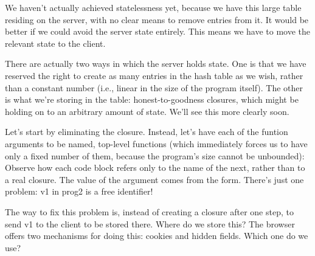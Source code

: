 
We haven’t actually achieved statelessness yet, because we have this large table
residing on the server, with no clear means to remove entries from it. It would
be better if we could avoid the server state entirely. This means we have to
move the relevant state to the client.

There are actually two ways in which the server holds state. One is that we have
reserved the right to create as many entries in the hash table as we wish,
rather than a constant number (i.e., linear in the size of the program itself).
The other is what we’re storing in the table: honest-to-goodness closures, which
might be holding on to an arbitrary amount of state. We’ll see this more clearly
soon.

Let’s start by eliminating the closure. Instead, let’s have each of the funtion
arguments to be named, top-level functions (which immediately forces us to have
only a fixed number of them, because the program’s size cannot be unbounded):
Observe how each code block refers only to the name of the next, rather than to
a real closure. The value of the argument comes from the form. There’s just one
problem: v1 in prog2 is a free identifier!

The way to fix this problem is, instead of creating a closure after one step, to
send v1 to the client to be stored there. Where do we store this? The browser
offers two mechanisms for doing this: cookies and hidden fields. Which one do we
use?

